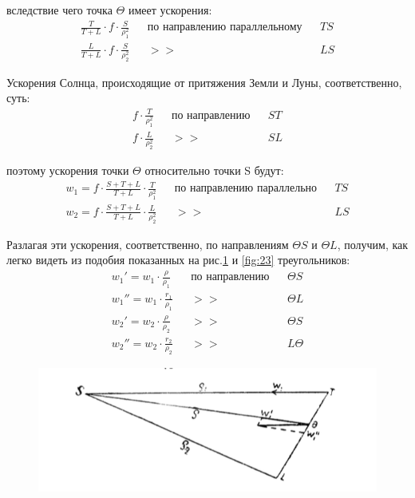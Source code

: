 \documentclass[a4paper,12pt]{article}
\begin{document}
вследствие чего точка $\Theta$ имеет ускорения:
\begin{equation*}
  \begin{aligned}
    \frac{T}{T+L} \cdot f \cdot \frac{S}{\rho_1 ^2} && \text{по направлению параллельному} && TS \\
    \frac{L}{T+L} \cdot f \cdot \frac{S}{\rho_2 ^2} && >> && LS
  \end{aligned}
\end{equation*}

Ускорения Солнца, происходящие от притяжения Земли и Луны, соответственно, суть:
\begin{equation*}
  \begin{aligned}
      f \cdot \frac{T}{\rho_1 ^2} && \text{по направлению} && ST \\
      f \cdot \frac{L}{\rho_2 ^2} && >> && SL
  \end{aligned}
\end{equation*}

поэтому ускорения точки $\Theta$ относительно точки S будут:
\begin{equation*}
  \begin{aligned}
      w_1 = f \cdot \frac{S+T+L}{T+L} \cdot \frac{T}{\rho_1 ^2} && \text{по направлению параллельно} && TS \\
      w_2 = f \cdot \frac{S+T+L}{T+L} \cdot \frac{L}{\rho_2 ^2} && >> && LS
  \end{aligned}
\end{equation*}

Разлагая эти ускорения, соответственно, по направлениям $\Theta S$ и $\Theta L$, получим, как легко видеть из подобия показанных на рис.\ref{fig:22} и \ref{fig:23} треугольников:
\begin{equation*}
  \begin{aligned}
      w_1 ' = w_1 \cdot \frac{\rho}{\rho_1} && \text{по направлению} && \Theta S \\
      w_1 '' = w_1 \cdot \frac{r_1}{\rho_1} && >> && \Theta L \\
      w_2 ' = w_2 \cdot \frac{\rho}{\rho_2} && >> && \Theta S \\
      w_2 '' = w_2 \cdot \frac{r_2}{\rho_2} && >> && L \Theta
  \end{aligned}
\end{equation*}

\begin{figure}[!h]
  \begin{center}
    \includegraphics[width=0.7\linewidth, keepaspectratio]{22.png}
    \caption{}\label{fig:22}
  \end{center}
\end{figure}
\end{document}
